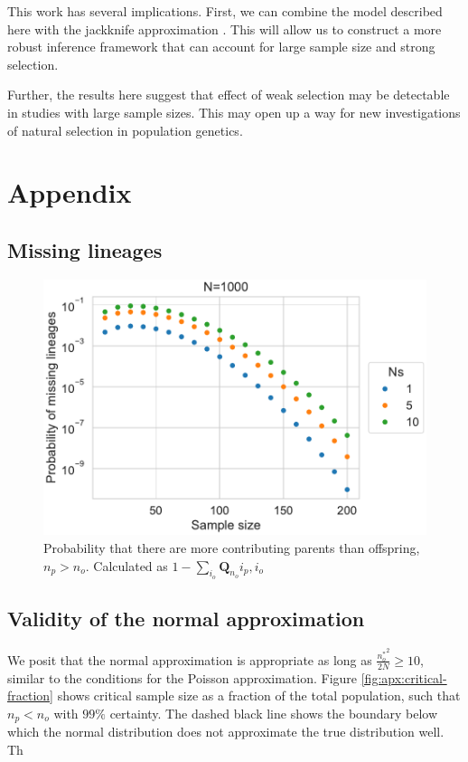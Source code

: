 \documentclass[review]{elsarticle}
\begin{document}
This work has several implications. First, we can combine the model described here with the
jackknife approximation \citep{JouganousEtAl2017}. This will allow us to construct a more robust
inference framework that can account for large sample size and strong selection.

Further, the results here suggest that effect of weak selection may be detectable in studies with
large sample sizes. This may open up a way for new investigations of natural selection in population
genetics.



\section{Appendix}

\subsection{Missing lineages}

\begin{figure}
  \centering
  \includegraphics[width=\textwidth]{fig/missing.pdf}
  \caption{Probability that there are more contributing parents than offspring, $n_p > n_o$.
    Calculated as $1-\sum_{i_o} \mathbf{Q}_{n_o}{i_p, i_o}$}
  \label{fig:apx:missing}
\end{figure}

\subsection{Validity of the normal approximation}

We posit that the normal approximation is appropriate as long as $\frac{{n_o^*}^2}{2N} \ge 10$,
similar to the conditions for the Poisson approximation. Figure \ref{fig:apx:critical-fraction}
shows critical sample size as a fraction of the total population, such that $n_p < n_o$ with $99\%$
certainty. The dashed black line shows the boundary below which the normal distribution does not
approximate the true distribution well. Th
\end{document}
